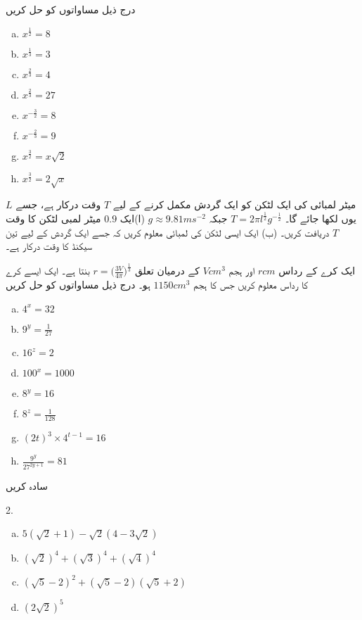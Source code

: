 درج ذیل مساواتوں کو حل کریں
\begin{multicols}{4}
\begin{enumerate}[a.]
\item
\(x^{\frac{1}{2}}=8\)
\item
\(x^{\frac{1}{3}}=3\)
\item
\(x^{\frac{2}{3}}=4\)
\item
\(x^{\frac{2}{3}}=27\)
\item
\(x^{-\frac{3}{2}}=8\)
\item
\(x^{-\frac{2}{3}}=9\)
\item
\(x^{\frac{3}{2}}=x\sqrt{2}\)
\item
\(x^{\frac{3}{2}}=2\sqrt{x}\)
\end{enumerate}
\end{multicols}
\(L\)
میٹر لمبائی کی ایک لٹکن کو ایک گردش مکمل کرنے کے لیے 
\(T\) وقت درکار ہے، جسے یوں لکھا جائے گا۔
\(T=2\pi l^{\frac{1}{2}}g^{-\frac{1}{2}}\)
 جبکہ
\(g\approx 9.81 ms^{-2}\)
(ا)ایک
 \(0.9\) 
میٹر لمبی لٹکن کا وقت
 \(T\) 
دریافت کریں۔
(ب) ایک ایسی لٹکن کی لمبائی معلوم کریں کہ جسے ایک گردش کے لیے تین سیکنڈ کا وقت درکار ہے۔

ایک کرے کے رداس 
\(r cm\) اور ہجم \(V cm^{3}\) کے درمیان تعلق
\(r=\big(\frac{3V}{4\pi}\big)^{\frac{1}{3}}\)
بنتا ہے۔ ایک ایسے کرے کا رداس معلوم کریں جس کا ہجم
 \(1150cm^{3}\) ہو۔
درج ذیل مساواتوں کو حل کریں
\begin{multicols}{4}
\begin{enumerate}[a.]
\item
\(4^{x}=32\)
\item
\(9^{y}=\frac{1}{27}\)
\item
\(16^{z}=2\)
\item
\(100^{x}=1000\)
\item
\(8^{y}=16\)
\item
\(8^{z}=\frac{1}{128}\)
\item
\((2t)^{3}\times 4^{t-1}=16\)
\item
\(\frac{9^{y}}{27^{2y+1}}=81\)
\end{enumerate}
\end{multicols}

سادہ کریں
\begin{multicols}{2.}
\begin{enumerate}[a.]
\item
\(5(\sqrt{2}+1)-\sqrt{2}(4-3\sqrt{2})\)
\item
\((\sqrt{2})^{4}+(\sqrt{3})^{4}+(\sqrt{4})^{4}\)
\item
\((\sqrt{5}-2)^{2}+(\sqrt{5}-2)(\sqrt{5}+2)\)
\item
\((2\sqrt{2})^{5}\)
\end{enumerate}
\end{multicols}

